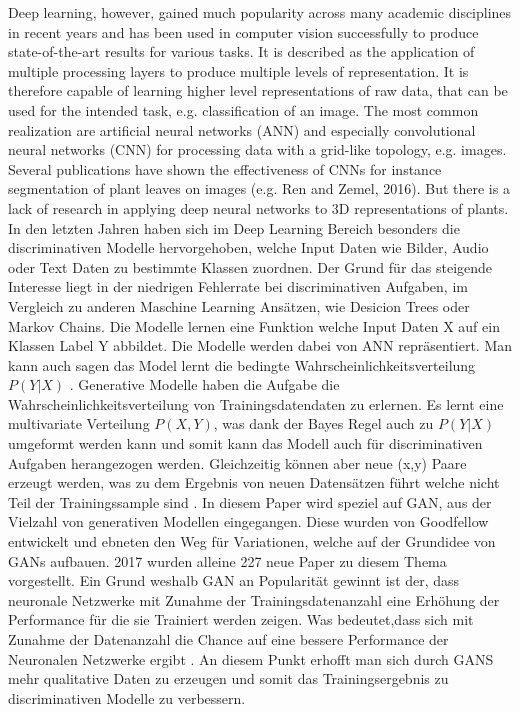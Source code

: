 \documentclass{llncs}
\begin{document}
	Deep learning, however, gained much popularity across many academic disciplines
	in recent years and has been used in computer vision successfully to
	produce state-of-the-art results for various tasks. It is described as the application
	of multiple processing layers to produce multiple levels of representation. It
	is therefore capable of learning higher level representations of raw data, that can
	be used for the intended task, e.g. classification of an image. The most common
	realization are artificial neural networks (ANN) and especially convolutional
	neural networks (CNN) for processing data with a grid-like topology, e.g. images.
	Several publications have shown the effectiveness of CNNs for instance
	segmentation of plant leaves on images (e.g. Ren and Zemel, 2016). But there
	is a lack of research in applying deep neural networks to 3D representations of
	plants.
	\\
	
	In den letzten Jahren haben sich im Deep Learning Bereich besonders die discriminativen Modelle hervorgehoben, welche Input Daten wie Bilder, Audio oder Text Daten zu bestimmte Klassen zuordnen. Der Grund für das steigende Interesse liegt in der niedrigen Fehlerrate bei discriminativen Aufgaben, im Vergleich zu anderen Maschine Learning Ansätzen, wie Desicion Trees oder Markov Chains\cite{Grundlagen}. Die Modelle lernen eine Funktion welche Input Daten X auf ein Klassen Label Y abbildet. Die Modelle werden dabei von ANN repräsentiert. Man kann auch sagen das Model lernt die bedingte Wahrscheinlichkeitsverteilung $P(Y|X)$ \cite{discrim}. Generative Modelle haben die Aufgabe die Wahrscheinlichkeitsverteilung von Trainingsdatendaten zu erlernen. Es lernt eine multivariate Verteilung $P(X,Y)$, was dank der Bayes Regel auch zu $P(Y|X)$ umgeformt werden kann und somit kann das Modell auch für discriminativen Aufgaben herangezogen werden. Gleichzeitig können aber neue (x,y) Paare erzeugt werden, was zu dem Ergebnis von neuen Datensätzen führt welche nicht Teil der Trainingssample sind \cite{discrim}. In diesem Paper wird speziel auf GAN, aus der Vielzahl von generativen Modellen eingegangen. Diese wurden von Goodfellow\cite{goodfellow2014} entwickelt und ebneten den Weg für Variationen, welche auf der Grundidee von GANs aufbauen. 2017 wurden alleine 227 neue Paper zu diesem Thema vorgestellt. Ein Grund weshalb GAN an Popularität gewinnt ist der, dass neuronale Netzwerke mit Zunahme der Trainingsdatenanzahl eine Erhöhung der Performance für die sie Trainiert werden zeigen. Was bedeutet,dass sich mit Zunahme der Datenanzahl die Chance auf eine bessere Performance der Neuronalen Netzwerke ergibt \cite{data}. An diesem Punkt erhofft man sich durch GANS mehr qualitative Daten zu erzeugen und somit das Trainingsergebnis zu discriminativen Modelle zu verbessern. 
	
\end{document}
